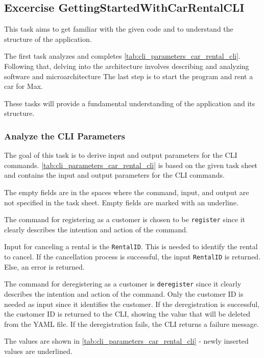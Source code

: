 \subsection{Excercise GettingStartedWithCarRentalCLI}
\label{sec:exercise_getting_started_with_car_rental_cli}
This task aims to get familiar with the given code and to understand the structure of the application.

The first task analyzes and completes \autoref{tab:cli_parameters_car_rental_cli}.
Following that, delving into the architecture involves describing and analyzing software and microarchitecture
The last step is to start the program and rent a car for Max.

These tasks will provide a fundamental understanding of the application and its structure.

\subsubsection*{Analyze the CLI Parameters}
The goal of this task is to derive input and output parameters for the CLI commands.
\autoref{tab:cli_parameters_car_rental_cli} is based on the given task sheet and contains the input and output parameters for the CLI commands.

The empty fields are in the spaces where the command, input, and output are not specified in the task sheet.
Empty fields are marked with an underline.

The command for registering as a customer is chosen to be \texttt{register} since it clearly describes the intention and action of the command.

Input for canceling a rental is the \texttt{RentalID}.
This is needed to identify the rental to cancel.
If the cancellation process is successful, the input \texttt{RentalID} is returned.
Else, an error is returned.

The command for deregistering as a customer is \texttt{deregister} since it clearly describes the intention and action of the command.
Only the customer ID is needed as input since it identifies the customer.
If the deregistration is successful, the customer ID is returned to the CLI, showing the value that will be deleted from the YAML file.
If the deregistration fails, the CLI returns a failure message.

The values are shown in \autoref{tab:cli_parameters_car_rental_cli} - newly inserted values are underlined.

